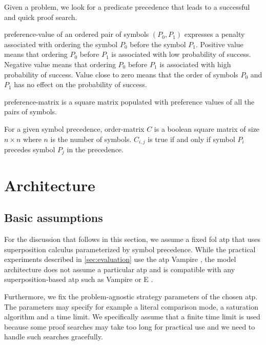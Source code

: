 Given a problem, we look for a predicate \gls{precedence} that leads to a successful and quick proof search.

\Gls{preference-value} of an ordered pair of symbols \((P_0, P_1)\) expresses a penalty associated with ordering the symbol \(P_0\) before the symbol \(P_1\).
Positive value means that ordering \(P_0\) before \(P_1\) is associated with low probability of success.
Negative value means that ordering \(P_0\) before \(P_1\) is associated with high probability of success.
Value close to zero means that the order of symbols \(P_0\) and \(P_1\) has no effect on the probability of success.

\Gls{preference-matrix} is a square matrix populated with preference values of all the pairs of symbols.

For a given symbol precedence,
\gls{order-matrix} \(C\) is a boolean square matrix of size \(n \times n\) where \(n\) is the number of symbols.
\(C_{i, j}\) is true if and only if symbol \(P_i\) precedes symbol \(P_j\) in the precedence.


\section{Architecture}

\subsection{Basic assumptions}

For the discussion that follows in this section,
we assume a fixed \gls{fol} \gls{atp} that uses superposition calculus parameterized by symbol precedence.
While the practical experiments described in \autoref{sec:evaluation} use the \gls{atp} Vampire \cite{Kovacs2013},
the model architecture does not assume a particular \gls{atp}
and is compatible with any superposition-based \gls{atp} such as Vampire or E \cite{SCV:CADE-2019}. 

Furthermore, we fix the problem-agnostic strategy parameters of the chosen \gls{atp}.
The parameters may specify for example a literal comparison mode, a saturation algorithm
and a time limit.
We specifically assume that a finite time limit is used
because some proof searches may take too long for practical use\cite{?}
and we need to handle such searches gracefully.

